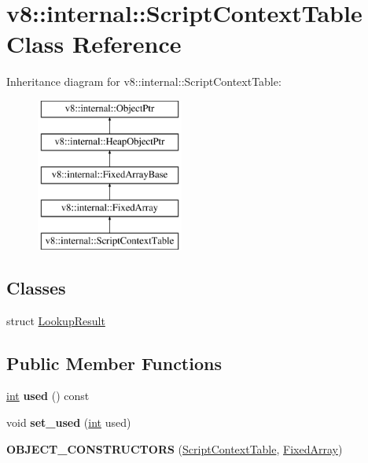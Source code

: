 \hypertarget{classv8_1_1internal_1_1ScriptContextTable}{}\section{v8\+:\+:internal\+:\+:Script\+Context\+Table Class Reference}
\label{classv8_1_1internal_1_1ScriptContextTable}
Inheritance diagram for v8\+:\+:internal\+:\+:Script\+Context\+Table\+:\begin{figure}[H]
\begin{center}
\leavevmode
\includegraphics[height=5.000000cm]{classv8_1_1internal_1_1ScriptContextTable}
\end{center}
\end{figure}
\subsection*{Classes}
\begin{DoxyCompactItemize}
\item 
struct \mbox{\hyperlink{structv8_1_1internal_1_1ScriptContextTable_1_1LookupResult}{Lookup\+Result}}
\end{DoxyCompactItemize}
\subsection*{Public Member Functions}
\begin{DoxyCompactItemize}
\item 
\mbox{\label{classv8_1_1internal_1_1ScriptContextTable_af7c30c4a89f80a2c6bfad748ac63fd4a}} 
\mbox{\hyperlink{classint}{int}} {\bfseries used} () const
\item 
\mbox{\label{classv8_1_1internal_1_1ScriptContextTable_a622a9d87e83c5992b22af18d6263b1e3}} 
void {\bfseries set\+\_\+used} (\mbox{\hyperlink{classint}{int}} used)
\item 
\mbox{\label{classv8_1_1internal_1_1ScriptContextTable_aecca6929a92d188b515cde38b613bb7f}} 
{\bfseries O\+B\+J\+E\+C\+T\+\_\+\+C\+O\+N\+S\+T\+R\+U\+C\+T\+O\+RS} (\mbox{\hyperlink{classv8_1_1internal_1_1ScriptContextTable}{Script\+Context\+Table}}, \mbox{\hyperlink{classv8_1_1internal_1_1FixedArray}{Fixed\+Array}})
\end{DoxyCompactItemize}
